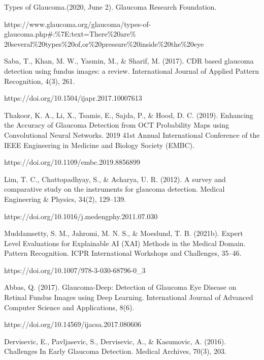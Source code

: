 \vspace{5mm}
\noindent[7] Types of Glaucoma.(2020, June 2). Glaucoma Research Foundation. 

\noindent https://www.glaucoma.org/glaucoma/types-of-glaucoma.php#:\%7E:text=There\%20are\% 20several\%20types\%20of,or\%20pressure\%20inside\%20the\%20eye

\vspace{5mm}
\noindent[8] Saba, T., Khan, M. W., Yasmin, M., & Sharif, M. (2017). CDR based glaucoma detection using fundus images: a review. International Journal of Applied Pattern Recognition, 4(3), 261. 

\noindent https://doi.org/10.1504/ijapr.2017.10007613

\vspace{5mm}
\noindent[9] Thakoor, K. A., Li, X., Tsamis, E., Sajda, P., & Hood, D. C. (2019). Enhancing the Accuracy of Glaucoma Detection from OCT Probability Maps using Convolutional Neural Networks. 2019 41st Annual International Conference of the IEEE Engineering in Medicine and Biology Society (EMBC). 

\noindent https://doi.org/10.1109/embc.2019.8856899

\vspace{5mm}
\noindent[10]  Lim, T. C., Chattopadhyay, S., & Acharya, U. R. (2012). A survey and comparative study on the instruments for glaucoma detection. Medical Engineering & Physics, 34(2), 129–139. 

\noindent https://doi.org/10.1016/j.medengphy.2011.07.030

\vspace{5mm}
\noindent[11] Muddamsetty, S. M., Jahromi, M. N. S., & Moeslund, T. B. (2021b). Expert Level Evaluations for Explainable AI (XAI) Methods in the Medical Domain. Pattern Recognition. ICPR International Workshops and Challenges, 35–46. 

\noindent https://doi.org/10.1007/978-3-030-68796-0_3

\vspace{5mm}
\noindent[12] Abbas, Q. (2017). Glaucoma-Deep: Detection of Glaucoma Eye Disease on Retinal Fundus Images using Deep Learning. International Journal of Advanced Computer Science and Applications, 8(6). 

\noindent https://doi.org/10.14569/ijacsa.2017.080606

\vspace{5mm}
\noindent[13]  Dervisevic, E., Pavljasevic, S., Dervisevic, A., & Kasumovic, A. (2016). Challenges In Early Glaucoma Detection. Medical Archives, 70(3), 203. 


